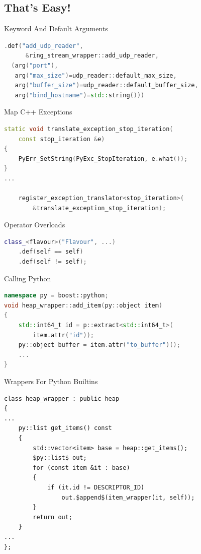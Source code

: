 \documentclass{beamer}
\begin{document}
\subsection{That's Easy!}

\begin{frame}[fragile=singleslide]{Keyword And Default Arguments}
  \begin{lstlisting}[language=c++]
.def("add_udp_reader",
      &ring_stream_wrapper::add_udp_reader,
  (arg("port"),
   arg("max_size")=udp_reader::default_max_size,
   arg("buffer_size")=udp_reader::default_buffer_size,
   arg("bind_hostname")=std::string()))
  \end{lstlisting}
\end{frame}

\begin{frame}[fragile=singleslide]{Map C++ Exceptions}
  \begin{lstlisting}[language=c++]
static void translate_exception_stop_iteration(
    const stop_iteration &e)
{
    PyErr_SetString(PyExc_StopIteration, e.what());
}
...

    register_exception_translator<stop_iteration>(
        &translate_exception_stop_iteration);
  \end{lstlisting}
\end{frame}

\begin{frame}[fragile=singleslide]{Operator Overloads}
  \begin{lstlisting}[language=c++]
class_<flavour>("Flavour", ...)
    .def(self == self)
    .def(self != self);
  \end{lstlisting}
\end{frame}

\begin{frame}[fragile=singleslide]{Calling Python}
  \begin{lstlisting}[language=c++]
namespace py = boost::python;
void heap_wrapper::add_item(py::object item)
{
    std::int64_t id = p::extract<std::int64_t>(
        item.attr("id"));
    py::object buffer = item.attr("to_buffer")();
    ...
}
  \end{lstlisting}
\end{frame}

\begin{frame}[fragile=singleslide]{Wrappers For Python Builtins}
  \begin{lstlisting}[language={[extra]c++}]
class heap_wrapper : public heap
{
...
    py::list get_items() const
    {
        std::vector<item> base = heap::get_items();
        $py::list$ out;
        for (const item &it : base)
        {
            if (it.id != DESCRIPTOR_ID)
                out.$append$(item_wrapper(it, self));
        }
        return out;
    }
...
};
  \end{lstlisting}
\end{frame}
\end{document}
